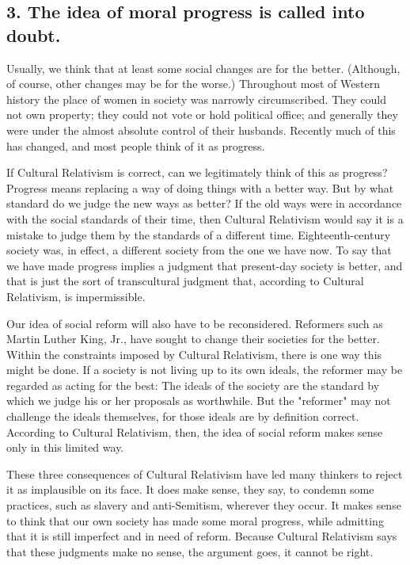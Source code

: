 \subsection{3. The idea of moral progress is called into doubt.}
Usually, we think that at  least  some  social  changes  are  for  the  better.  (Although,  of  course, 
other  changes  may  be  for  the  worse.)  Throughout  most  of  Western 
history the place of women in society was narrowly circumscribed. They 
could  not  own  property;  they  could  not  vote  or  hold  political  office;  and 
generally they were under the almost absolute control of their husbands. 
Recently  much  of  this  has  changed,  and  most  people  think  of  it  as 
progress.

If  Cultural  Relativism  is  correct,  can  we  legitimately  think  of  this  as 
progress? Progress means replacing a way of doing things with a better 
way.  But  by  what  standard  do  we  judge  the  new  ways as  better?  If  the 
old ways were in accordance with the social standards of their time, then 
Cultural  Relativism  would  say  it  is  a  mistake  to  judge  them  by  the 
standards of a different time. Eighteenth-century society was, in effect, a 
different society from the one we have now. To  say that  we have made 
progress implies  a  judgment  that  present-day society  is better,  and that 
is  just  the  sort  of  transcultural  judgment  that,  according  to  Cultural 
Relativism, is impermissible. 

Our  idea  of  social  reform  will  also  have  to  be  reconsidered.  Reformers 
such as Martin Luther King, Jr., have sought to change their societies for 
the better. Within the constraints imposed by Cultural Relativism, there is 
one way this might be done. If a society is not living up to its own ideals, 
the  reformer  may  be  regarded  as  acting  for  the  best:  The  ideals  of  the 
society  are  the  standard  by  which  we  judge  his  or  her  proposals  as 
worthwhile. But the "reformer" may not challenge the ideals themselves, 
for those ideals are by definition correct. According to Cultural 
Relativism,  then,  the  idea  of  social  reform  makes  sense  only  in  this 
limited way. 

These three consequences of Cultural Relativism have led many 
thinkers  to reject it as implausible on  its face. It does make  sense, they 
say,  to  condemn  some  practices,  such  as  slavery  and  anti-Semitism, 
wherever  they  occur.  It  makes  sense  to  think  that  our  own  society  has 
made some moral progress, while admitting that it is still imperfect and in 
need  of  reform.  Because  Cultural  Relativism says  that  these  judgments 
make no sense, the argument goes, it cannot be right. 

